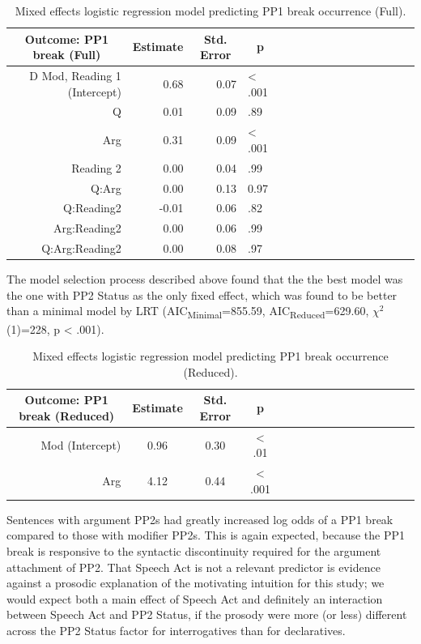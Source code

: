 \documentclass[11pt,oneside]{book}
\begin{document}
\begin{table}[!h]

\caption{\label{tab:fullpp1Mod}Mixed effects logistic regression model predicting PP1 break occurrence (Full).}
\centering
\begin{tabular}{rrrlrrrlrrrlrrrl}
\toprule
\multicolumn{1}{c}{Outcome: PP1 break (Full)} & \multicolumn{1}{c}{Estimate} & \multicolumn{1}{c}{Std. Error} & \multicolumn{1}{c}{p}\\
\midrule
D Mod, Reading 1 (Intercept) & 0.68 & 0.07 & < .001\\
Q & 0.01 & 0.09 & .89\\
Arg & 0.31 & 0.09 & < .001\\
Reading 2 & 0.00 & 0.04 & .99\\
Q:Arg & 0.00 & 0.13 & 0.97\\
\addlinespace
Q:Reading2 & -0.01 & 0.06 & .82\\
Arg:Reading2 & 0.00 & 0.06 & .99\\
Q:Arg:Reading2 & 0.00 & 0.08 & .97\\
\bottomrule
\end{tabular}
\end{table}

The model selection process described above found that the the best model was the one with PP2 Status as the only fixed effect, which was found to be better than a minimal model by LRT (AIC\textsubscript{Minimal}=855.59, AIC\textsubscript{Reduced}=629.60, \(\chi^2\)(1)=228, p \textless{} .001).

\begin{table}[!h]

\caption{\label{tab:pp1Mod}Mixed effects logistic regression model predicting PP1 break occurrence (Reduced).}
\centering
\begin{tabular}{rcccrcccrcccrccc}
\toprule
\multicolumn{1}{c}{Outcome: PP1 break (Reduced)} & \multicolumn{1}{c}{Estimate} & \multicolumn{1}{c}{Std. Error} & \multicolumn{1}{c}{p}\\
\midrule
Mod (Intercept) & 0.96 & 0.30 & < .01\\
Arg & 4.12 & 0.44 & < .001\\
\bottomrule
\end{tabular}
\end{table}

Sentences with argument PP2s had greatly increased log odds of a PP1 break compared to those with modifier PP2s. This is again expected, because the PP1 break is responsive to the syntactic discontinuity required for the argument attachment of PP2. That Speech Act is not a relevant predictor is evidence against a prosodic explanation of the motivating intuition for this study; we would expect both a main effect of Speech Act and definitely an interaction between Speech Act and PP2 Status, if the prosody were more (or less) different across the PP2 Status factor for interrogatives than for declaratives.
\end{document}
